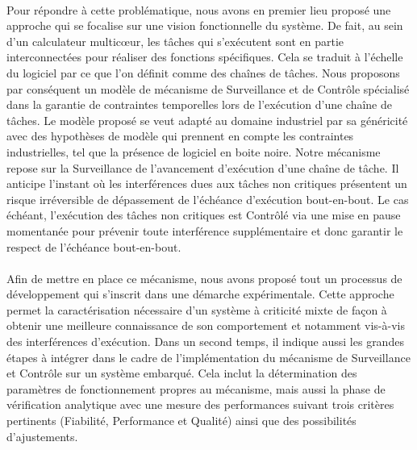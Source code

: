 \documentclass[a4paper,11pt,twoside]{StyleThese}
\begin{document}
\paragraph*{} Pour répondre à cette problématique, nous avons en premier lieu proposé une approche qui se focalise sur une vision fonctionnelle du système. De fait, au sein d'un calculateur multicœur, les tâches qui s'exécutent sont en partie interconnectées pour réaliser des fonctions spécifiques. Cela se traduit à l'échelle du logiciel par ce que l'on définit comme des chaînes de tâches. Nous proposons par conséquent un modèle de mécanisme de Surveillance et de Contrôle spécialisé dans la garantie de contraintes temporelles lors de l'exécution d'une chaîne de tâches. Le modèle proposé se veut adapté au domaine industriel par sa généricité avec des hypothèses de modèle qui prennent en compte les contraintes industrielles, tel que la présence de logiciel en boite noire.
Notre mécanisme repose sur la Surveillance de l'avancement d'exécution d'une chaîne de tâche. Il anticipe l'instant où les interférences dues aux tâches non critiques présentent un risque irréversible de dépassement de l'échéance d'exécution bout-en-bout. Le cas échéant, l'exécution des tâches non critiques est Contrôlé via une mise en pause momentanée pour prévenir toute interférence supplémentaire et donc garantir le respect de l'échéance bout-en-bout.

\paragraph*{} Afin de mettre en place ce mécanisme, nous avons proposé tout un processus de développement qui s'inscrit dans une démarche expérimentale. Cette approche permet la caractérisation nécessaire d'un système à criticité mixte de façon à obtenir une meilleure connaissance de son comportement et notamment vis-à-vis des interférences d'exécution. Dans un second temps, il indique aussi les grandes étapes à intégrer dans le cadre de l'implémentation du mécanisme de Surveillance et Contrôle sur un système embarqué. Cela inclut la détermination des paramètres de fonctionnement propres au mécanisme, mais aussi la phase de vérification analytique avec une mesure des performances suivant trois critères pertinents (Fiabilité, Performance et Qualité) ainsi que des possibilités d'ajustements.
\end{document}
